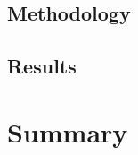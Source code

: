 
\subsection{Methodology} %
\label{sub:methodology_approximation}


\subsection{Results} %
\label{sub:results_approximation}



\section{Summary} %
\label{sec:summary_approximation}

